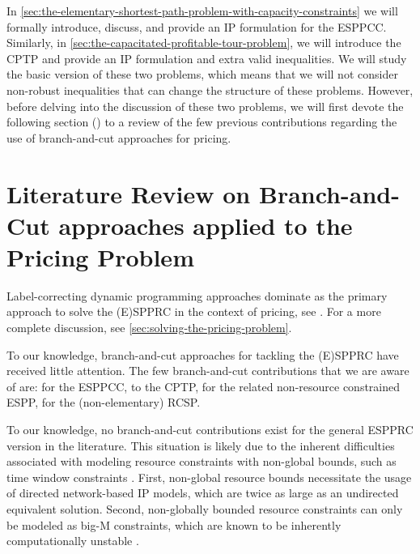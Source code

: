\medskip

In \cref{sec:the-elementary-shortest-path-problem-with-capacity-constraints}
we will formally introduce, discuss, and provide an IP formulation for the ESPPCC.
Similarly, in \cref{sec:the-capacitated-profitable-tour-problem},
we will introduce the CPTP and provide an IP formulation and extra valid inequalities.
We will study the basic version of these two problems,
which means that we will not consider non-robust inequalities
that can change the structure of these problems.
However, before delving into the discussion of these two problems,
we will first devote the following section ()
to a review of the few previous contributions regarding
the use of branch-and-cut approaches for pricing.

\section{Literature Review on Branch-and-Cut approaches applied to the Pricing Problem}
\label{sec:bac-approaches-for-the-pricing-problem}

Label-correcting dynamic programming approaches
dominate as the primary approach to solve the (E)SPPRC in the context of pricing,
see \cite{desrochers1992, feillet2004, righini2004, righini2006, boland2006, righini2008, pugliese2010, baldacci2011, lozano2013, lozano2016, sadykov2021bucket}.
For a more complete discussion, see \cref{sec:solving-the-pricing-problem}.

To our knowledge, branch-and-cut approaches for tackling the (E)SPPRC have received little attention.
The few branch-and-cut contributions that we are aware of are:
\textcite{jepsen2008branchandcut} for the ESPPCC,
\textcite{jepsen2011,jepsen2014} to the CPTP,
\textcite{taccari2016, drexl2014} for the related non-resource constrained ESPP,
\textcite{horvath2016} for the (non-elementary) RCSP.

To our knowledge,
no branch-and-cut contributions exist for the general ESPPRC version in the literature.
This situation is likely due to the inherent difficulties
associated with modeling resource constraints with non-global bounds,
such as time window constraints \parencite{jepsen2008branchandcut}.
First, non-global resource bounds necessitate the usage
of directed network-based IP models,
which are twice as large as an undirected equivalent solution.
Second, non-globally bounded resource constraints
can only be modeled as big-M constraints,
which are known to be inherently computationally unstable \parencite{jepsen2008branchandcut}.


